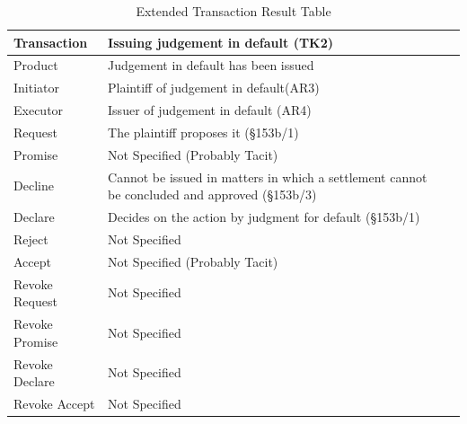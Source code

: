 \begin{landscape}
\begin{table}[h]
\caption{Extended Transaction Result Table}
\label{tab:etrt}
\begin{tabular}{|l||l|l|}
\hline
Transaction  & Issuing judgement in default (TK2) \\ \hline
Product  & Judgement in default has been issued \\ \hline
Initiator      &  Plaintiff of judgement in default(AR3)\\ \hline
Executor       &  Issuer of judgement in default (AR4)      \\ \hline
Request        & The plaintiff proposes it (\S153b/1)   \\ \hline
Promise        &  Not Specified (Probably Tacit)   \\ \hline
Decline        &  Cannot be issued in matters in which a settlement cannot be concluded and approved (\S153b/3) \\ \hline
Declare        & Decides on the action by judgment for default (\S153b/1) \\ \hline
Reject         &  Not Specified   \\ \hline
Accept         &  Not Specified (Probably Tacit) \\ \hline
Revoke Request &  Not Specified        \\ \hline
Revoke Promise &  Not Specified       \\ \hline
Revoke Declare &  Not Specified      \\ \hline
Revoke Accept  &  Not Specified             \\ \hline
\end{tabular}
\end{table}


\end{landscape}
